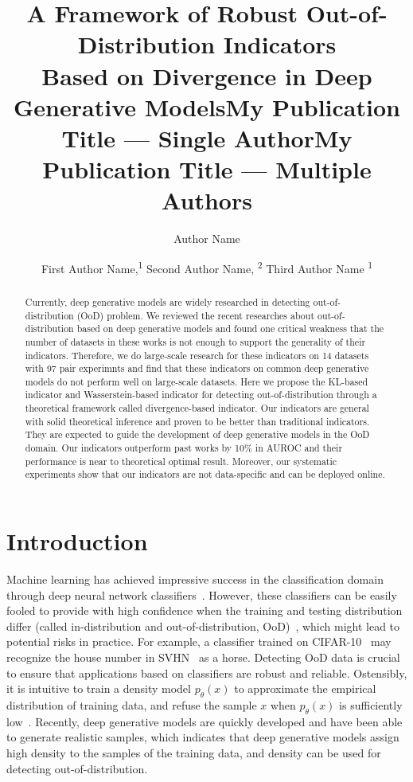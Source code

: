 \documentclass[letterpaper]{article} %
\title{A Framework of Robust Out-of-Distribution Indicators \\ Based on Divergence in Deep Generative Models}
\author{
}
\title{My Publication Title --- Single Author}
\author {
    Author Name \\
}
\title{My Publication Title --- Multiple Authors}
\author {

        First Author Name,\textsuperscript{\rm 1}
        Second Author Name, \textsuperscript{\rm 2}
        Third Author Name \textsuperscript{\rm 1} \\
}
\begin{document}
\linenumbers  %

\maketitle

\begin{abstract}

Currently, deep generative models are widely researched in detecting out-of-distribution (OoD) problem. We reviewed the recent researches about out-of-distribution based on deep generative models and found one critical weakness that the number of datasets in these works is not enough to support the generality of their indicators. 
Therefore, we do large-scale research for these indicators on 14 datasets with 97 pair experimnts and find that these indicators on common deep generative models do not perform well on large-scale datasets. 
Here we propose the KL-based indicator and Wasserstein-based indicator for detecting out-of-distribution through a theoretical framework called divergence-based indicator. 
Our indicators are general with solid theoretical inference and proven to be better than traditional indicators. They are expected to guide the development of deep generative models in the OoD domain. 
Our indicators outperform past works by 10\% in AUROC and their performance is near to theoretical optimal result. Moreover, our systematic experiments show that our indicators are not data-specific and can be deployed online. 
 
\end{abstract}

\section{Introduction}
Machine learning has achieved impressive success in the classification domain through deep neural network classifiers~\cite{szegedy2016inception,he2016deep,zagoruyko2016wide}. However, these classifiers can be easily fooled to provide with high confidence when the training and testing distribution differ (called in-distribution and out-of-distribution, OoD)~\cite{nguyen2015deep}, which might lead to potential risks in practice. 
For example, a classifier trained on CIFAR-10~\cite{krizhevsky2009learning} may recognize the house number in SVHN~\cite{netzer2011reading} as a horse. 
Detecting OoD data is crucial to ensure that applications based on classifiers are robust and reliable. 
Ostensibly, it is intuitive to train a density model $p_\theta(x)$ to approximate the empirical distribution of training data, and refuse the sample $x$ when $p_\theta(x)$ is sufficiently low~\cite{bishop1994novelty}. 
Recently, deep generative models are quickly developed and have been able to generate realistic samples, which indicates that deep generative models assign high density to the samples of the training data, and density can be used for detecting out-of-distribution. 
\end{document}
